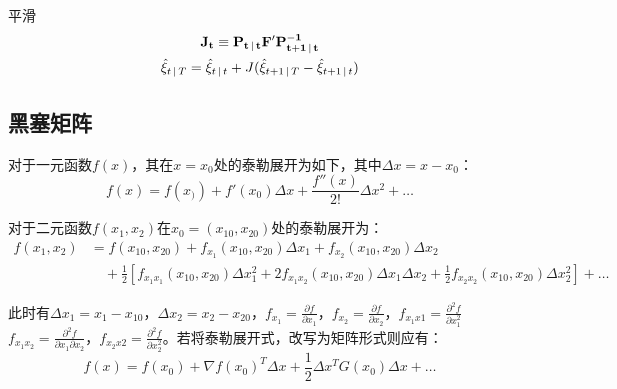 \documentclass[11pt]{article}
\begin{document}
平滑
\begin{gather*}
    \mathbf{J_t} \equiv \mathbf{P_{t\,\vert\, t}F'P^{-1}_{t+1\,\vert\, t}} \\
    \hat{\mathbf{\xi}}_{t \,\vert\, T} = \hat{\mathbf{\xi}}_{t \,\vert\, t} + J(\hat{\xi}_{t+1 \,\vert\, T} - \hat{\xi}_{t+1 \,\vert\, t})
\end{gather*}

\appendix

\begin{appendices}

\section{黑塞矩阵}

对于一元函数$f(x)$，其在$x=x_0$处的泰勒展开为如下，其中$\Delta x = x - x_0$：
\begin{equation*}
    f(x) = f(x_)) + f'(x_0) \Delta x + \frac{f''(x)}{2!}\Delta x^2 + \dots
\end{equation*}

对于二元函数$f(x_1,x_2)$在$x_0=(x_{10},x_{20})$处的泰勒展开为：
\begin{align*}
    f(x_1,x_2) &= f(x_{10},x_{20}) + f_{x_1}(x_{10},x_{20})\Delta x_1 + f_{x_2}(x_{10},x_{20})\Delta x_2 \\
    &\quad + \frac{1}{2} \left[ f_{x_1 x_1} (x_{10},x_{20})\Delta x_1^2 + 2 f_{x_1 x_2} (x_{10},x_{20})\Delta x_1 \Delta x_2 + \frac{1}{2} f_{x_2 x_2} (x_{10},x_{20}) \Delta x_2^2 \right] + \dots
\end{align*}

此时有$\Delta x_1 = x_1 - x_{10}$，$\Delta x_2 = x_2 - x_{20}$，$f_{x_1} = \frac{\partial f}{\partial x_1}$，$f_{x_2} = \frac{\partial f}{\partial x_2}$，$f_{x_1 x1} = \frac{\partial^2 f}{\partial x_1^2}$
$f_{x_1 x_2} = \frac{\partial^2 f}{\partial x_1 \partial x_2}$，$f_{x_2 x2} = \frac{\partial^2 f}{\partial x_2^2}$。若将泰勒展开式，改写为矩阵形式则应有：
\begin{equation*}
    f(x) = f(x_0) + \nabla f(x_0)^{T}\Delta x + \frac{1}{2}\Delta x^{T} G(x_0) \Delta x + \dots
\end{equation*}


\end{appendices}
\end{document}
